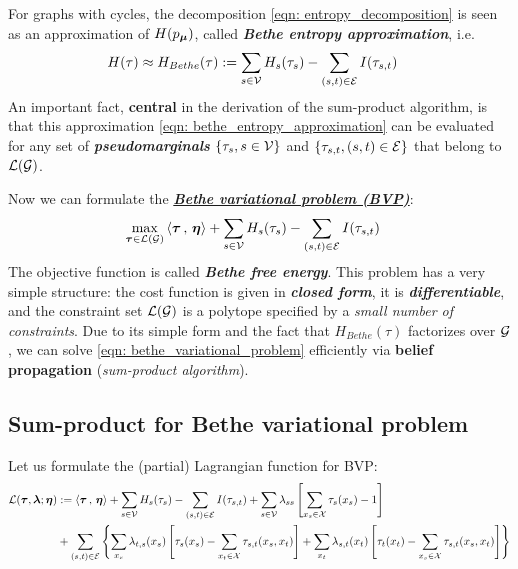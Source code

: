 \documentclass[11pt]{article}
\begin{document}
For graphs with cycles, the decomposition \eqref{eqn: entropy_decomposition} is seen as an approximation of $H(p_{\boldsymbol{\mu}})$, called \textbf{\emph{Bethe entropy approximation}}, i.e.
\begin{align}
H(\tau) &\approx H_{Bethe}(\tau) :=  \sum_{s \in {\mathcal V}}H_{s}(\tau_{s}) - \sum_{(s,t) \in {\mathcal E}}I(\tau_{s,t})  \label{eqn: bethe_entropy_approximation}
\end{align}
An important fact, \textbf{central} in the derivation of the sum-product algorithm, is that this approximation \eqref{eqn: bethe_entropy_approximation} can be evaluated for any set of \emph{\textbf{pseudomarginals}} $\{\tau_s , s \in  {\mathcal V} \}$ and $\{\tau_{s,t}, (s,t ) \in {\mathcal E}\}$ that belong to ${\mathcal L}({\mathcal G})$. 

Now we can formulate the \underline{\emph{\textbf{Bethe variational problem (BVP)}}}:
\begin{align}
\max_{\boldsymbol{\tau} \in {\mathcal L}({\mathcal G})}& \left\langle \boldsymbol{\tau}\,,\, \boldsymbol{\eta} \right\rangle +  \sum_{s \in {\mathcal V}}H_{s}(\tau_{s}) - \sum_{(s,t) \in {\mathcal E}}I(\tau_{s,t}) \label{eqn: bethe_variational_problem}
\end{align} The objective function is called \emph{\textbf{Bethe free energy}}. This problem has a very simple structure: the cost function is given in \textbf{\emph{closed form}}, it is \textbf{\emph{differentiable}}, and the constraint set ${\mathcal L}({\mathcal G})$ is a polytope specified by a \emph{small number of constraints}. Due to its simple form and the fact that $H_{Bethe}(\tau)$ factorizes over ${\mathcal G}$, we can solve \eqref{eqn: bethe_variational_problem} efficiently via \textbf{belief propagation} (\emph{sum-product algorithm}). 

\subsection{Sum-product for Bethe variational problem}
Let us formulate the (partial) Lagrangian function for BVP:
\begin{align}
{\mathcal L}(\boldsymbol{\tau}, \boldsymbol{\lambda}; \boldsymbol{\eta}) &:=  \left\langle \boldsymbol{\tau}\,,\, \boldsymbol{\eta} \right\rangle +  \sum_{s \in {\mathcal V}}H_{s}(\tau_{s}) - \sum_{(s,t) \in {\mathcal E}}I(\tau_{s,t}) +\sum_{s\in {\mathcal V}} \lambda_{ss}\left[ \sum_{x_s \in {\mathcal X}}\tau_{s}(x_s) - 1\right] \nonumber\\
& + \sum_{(s,t) \in {\mathcal E}}\left\{\sum_{x_s}\lambda_{t,s}(x_s)\left[\tau_{s}(x_s) - \sum_{x_t \in {\mathcal X}}\tau_{s,t}(x_s, x_t) \right] + \sum_{x_t}\lambda_{s,t}(x_t)\left[\tau_{t}(x_t) - \sum_{x_s \in {\mathcal X}}\tau_{s,t}(x_s, x_t) \right]\right\} \label{eqn: lagrangian_bvp}
\end{align}
\end{document}
